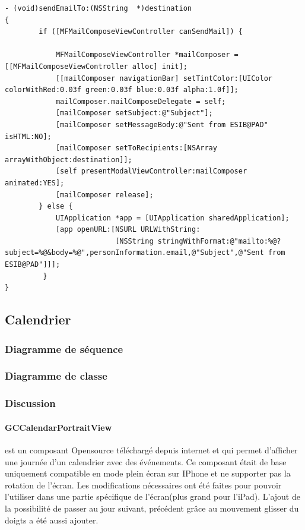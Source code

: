 \begin{lstlisting}[name=Recherche dans UITableView  , label=searchTBV]
- (void)sendEmailTo:(NSString  *)destination
{
		if ([MFMailComposeViewController canSendMail]) {
            
            MFMailComposeViewController *mailComposer = [[MFMailComposeViewController alloc] init];
            [[mailComposer navigationBar] setTintColor:[UIColor colorWithRed:0.03f green:0.03f blue:0.03f alpha:1.0f]];
            mailComposer.mailComposeDelegate = self;
            [mailComposer setSubject:@"Subject"];
            [mailComposer setMessageBody:@"Sent from ESIB@PAD" isHTML:NO];
            [mailComposer setToRecipients:[NSArray arrayWithObject:destination]];
            [self presentModalViewController:mailComposer animated:YES];
            [mailComposer release];
        } else {
            UIApplication *app = [UIApplication sharedApplication];
            [app openURL:[NSURL URLWithString:
                          [NSString stringWithFormat:@"mailto:%@?subject=%@&body=%@",personInformation.email,@"Subject",@"Sent from ESIB@PAD"]]];
         }
}
\end{lstlisting}

	\subsection{Calendrier}
					\subsubsection*{Diagramme de séquence}

					\subsubsection*{Diagramme de classe}
						 	
					\subsubsection*{Discussion}
					\paragraph{GCCalendarPortraitView} est un composant Opensource téléchargé depuis internet et qui permet d'afficher une journée d'un calendrier avec des événements. Ce composant était de base uniquement compatible en mode plein écran sur IPhone et ne supporter pas la rotation de l'écran. Les modifications nécessaires ont été faites pour pouvoir l'utiliser dans une partie spécifique de l'écran(plus grand pour l'iPad). L'ajout de la possibilité de passer au jour suivant, précédent grâce au mouvement glisser du doigts a été aussi ajouter. 
\lstset{
		style = Xcode,
		caption=Enregistrement pour les notifications du mouvement glissement du doigt et réception de l'événement ,
		breaklines=true,
		frame=single
}
				
